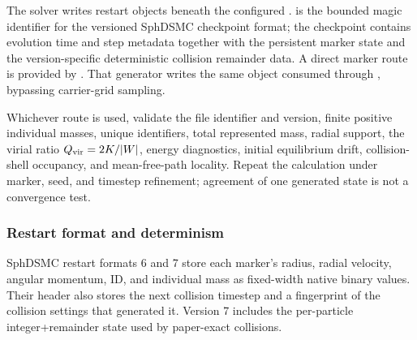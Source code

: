 The solver writes  restart objects beneath the configured
.   is the bounded magic identifier for
the versioned SphDSMC checkpoint format; the checkpoint contains evolution
time and step metadata together with the persistent marker state and the
version-specific deterministic collision remainder data.
A direct marker route is provided by
.  That generator
writes the same  object consumed through
, bypassing carrier-grid sampling.

Whichever route is used, validate the file identifier and version, finite
positive individual masses, unique identifiers, total represented mass,
radial support, the virial ratio \(Q_{\rm vir}=2K/|W|\), energy diagnostics,
initial equilibrium drift, collision-shell occupancy, and mean-free-path
locality.  Repeat the calculation under marker, seed, and timestep refinement;
agreement of one generated state is not a convergence test.

\subsubsection{Restart format and determinism}

SphDSMC restart formats 6 and 7 store each marker's radius, radial velocity,
angular momentum, ID, and individual mass as fixed-width native binary values.
Their header also stores the next collision timestep and a fingerprint of
the collision settings that generated it.  Version 7 includes the per-particle
integer+remainder state used by paper-exact collisions.

